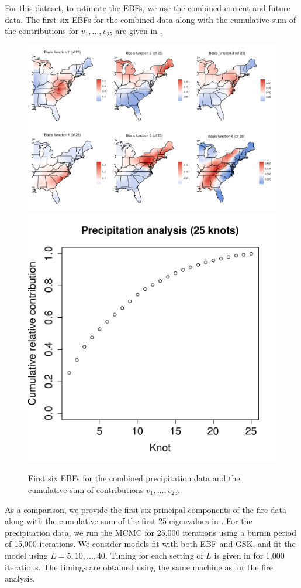 For this dataset, to estimate the EBFs, we use the combined current and future data.
The first six EBFs for the combined data along with the cumulative sum of the contributions for $v_1, \ldots, v_{25}$ are given in .
\begin{figure}[htbp]  %
  \centering
  \includegraphics[width=\linewidth]{plots/precip-ebf-panel.pdf}\\
  \includegraphics[width=0.35\linewidth]{plots/precipv-25.pdf}
  \caption{First six EBFs for the combined precipitation data and the cumulative sum of contributions $v_1, \ldots, v_{25}$.}
  \label{ebfig:precip-ebfpanel}
\end{figure}
As a comparison, we provide the first six principal components of the fire data along with the cumulative sum of the first 25 eigenvalues in .
For the precipitation data, we run the MCMC for 25,000 iterations using a burnin period of 15,000 iterations.
We consider models fit with both EBF and GSK, and fit the model using $L = 5, 10, \ldots, 40$.
Timing for each setting of $L$ is given in  for 1,000 iterations.
The timings are obtained using the same machine as for the fire analysis.

